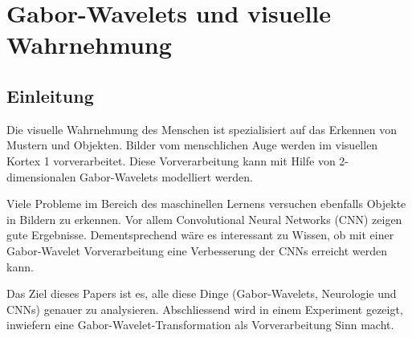 %
%
%
\chapter{Gabor-Wavelets und visuelle Wahrnehmung\label{chapter:visuell}}
\begin{refsection}

\section{Einleitung}

Die visuelle Wahrnehmung des Menschen ist spezialisiert auf das Erkennen von Mustern und Objekten.
%
Bilder vom menschlichen Auge werden im visuellen Kortex 1 vorverarbeitet.
%
%
Diese Vorverarbeitung kann mit Hilfe von 2-dimensionalen Gabor-Wavelets modelliert werden.

Viele Probleme im Bereich des maschinellen Lernens versuchen ebenfalls Objekte in Bildern zu erkennen.
Vor allem Convolutional Neural Networks (CNN) zeigen gute Ergebnisse.
%
Dementsprechend wäre es interessant zu Wissen, ob mit einer Gabor-Wavelet Vorverarbeitung eine Verbesserung der CNNs erreicht werden kann.

Das Ziel dieses Papers ist es, alle diese Dinge (Gabor-Wavelets, Neurologie und CNNs) genauer zu analysieren.
Abschliessend wird in einem Experiment gezeigt, inwiefern eine Gabor-Wavelet-Transformation als Vorverarbeitung Sinn macht.








\printbibliography[heading=subbibliography]
\end{refsection}
